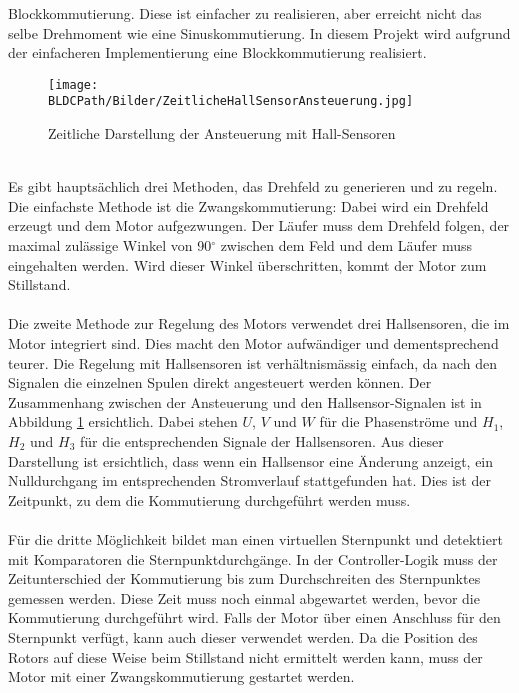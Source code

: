         Blockkommutierung. Diese ist einfacher zu realisieren, aber erreicht 
        nicht das selbe Drehmoment wie eine Sinuskommutierung. In diesem 
        Projekt wird aufgrund der einfacheren Implementierung eine 
        Blockkommutierung realisiert. \\
    \ifSTANDALONE
        \begin{figure}[h!]
            \texttt{[image: \\BLDCPath/Bilder/ZeitlicheHallSensorAnsteuerung.jpg]}
            \centering
            \caption[Zeitliche Darstellung der Ansteuerung mit Hall-Sensoren]
            {Zeitliche Darstellung der Ansteuerung mit Hall-Sensoren \cite{AppNote:BrushlessuC}}
            \label{abb:ZeitlicheAnsteuerungBrushlessMotor}
        \end{figure}
    \fi
        \\
        Es gibt hauptsächlich drei Methoden, das Drehfeld zu generieren und zu 
        regeln. Die einfachste Methode ist die Zwangskommutierung: 
        Dabei wird ein Drehfeld erzeugt und dem Motor aufgezwungen. Der Läufer 
        muss dem Drehfeld folgen, der maximal zulässige Winkel von 90$^\circ$
        zwischen dem Feld und dem Läufer muss eingehalten werden. Wird dieser 
        Winkel überschritten, kommt der Motor zum Stillstand.\\
        \\
        Die zweite Methode zur Regelung des Motors verwendet drei Hallsensoren, die im 
        Motor integriert sind. Dies macht den Motor aufwändiger und 
        dementsprechend teurer. Die Regelung mit Hallsensoren ist 
        verhältnismässig einfach, da nach den Signalen die einzelnen Spulen 
        direkt angesteuert werden können. Der Zusammenhang zwischen der 
        Ansteuerung und den Hallsensor-Signalen ist in Abbildung 
        \ref{abb:ZeitlicheAnsteuerungBrushlessMotor} ersichtlich. Dabei stehen 
        $U$, $V$ und $W$ für die Phasenströme und $H_1$, $H_2$ und $H_3$ für die 
        entsprechenden Signale der Hallsensoren. Aus dieser Darstellung ist 
        ersichtlich, dass wenn ein Hallsensor eine Änderung anzeigt, 
        ein Nulldurchgang im entsprechenden Stromverlauf stattgefunden hat. 
        Dies ist der Zeitpunkt, zu dem die Kommutierung durchgeführt werden 
        muss.\\
        \\
        Für die dritte Möglichkeit bildet man einen virtuellen Sternpunkt 
        und detektiert mit Komparatoren die Sternpunktdurchgänge. 
        In der Controller-Logik muss der Zeitunterschied der Kommutierung 
        bis zum Durchschreiten des Sternpunktes gemessen werden. Diese Zeit 
        muss noch einmal abgewartet werden, bevor die Kommutierung durchgeführt 
        wird. Falls der Motor über einen Anschluss für den Sternpunkt 
        verfügt, kann auch dieser verwendet werden. Da die Position des Rotors 
        auf diese Weise beim Stillstand nicht ermittelt werden kann, muss der 
        Motor mit einer Zwangskommutierung gestartet werden. 
\ifSTANDALONE
